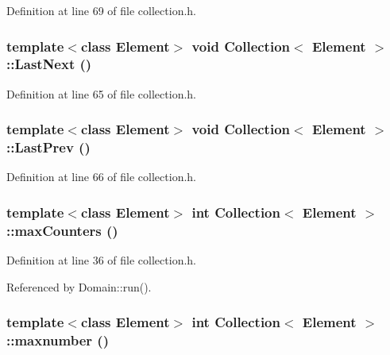 Definition at line 69 of file collection.h.\hypertarget{classCollection_8df9a591b311c789a49b9e7ebc8982b5}{
\subsubsection[{LastNext}]{\setlength{\rightskip}{0pt plus 5cm}template$<$class Element$>$ void {\bf Collection}$<$ Element $>$::LastNext ()}}
\label{classCollection_8df9a591b311c789a49b9e7ebc8982b5}




Definition at line 65 of file collection.h.\hypertarget{classCollection_c72a422277e0f0b0964de5bf098ccfcb}{
\subsubsection[{LastPrev}]{\setlength{\rightskip}{0pt plus 5cm}template$<$class Element$>$ void {\bf Collection}$<$ Element $>$::LastPrev ()}}
\label{classCollection_c72a422277e0f0b0964de5bf098ccfcb}




Definition at line 66 of file collection.h.\hypertarget{classCollection_bb3cb48f763445fa80a5d47f42457fd9}{
\subsubsection[{maxCounters}]{\setlength{\rightskip}{0pt plus 5cm}template$<$class Element$>$ int {\bf Collection}$<$ Element $>$::maxCounters ()}}
\label{classCollection_bb3cb48f763445fa80a5d47f42457fd9}




Definition at line 36 of file collection.h.

Referenced by Domain::run().\hypertarget{classCollection_5ed56e4ca2e6a9e416628c8996599839}{
\subsubsection[{maxnumber}]{\setlength{\rightskip}{0pt plus 5cm}template$<$class Element$>$ int {\bf Collection}$<$ Element $>$::maxnumber ()}}
\label{classCollection_5ed56e4ca2e6a9e416628c8996599839}




